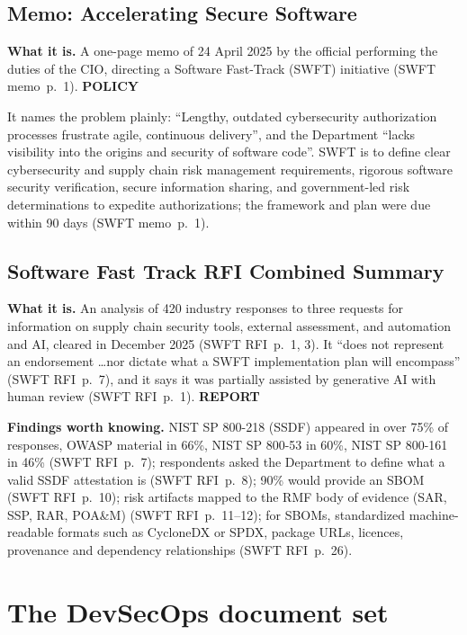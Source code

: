 \documentclass[11pt,letterpaper,twoside,openany]{memoir}
\newcommand{\pg}[2]{{\small(#1~p.~#2)}}          %
\newcommand{\st}[1]{{\sffamily\scriptsize\bfseries #1}}   %
\begin{document}
\section{Memo: Accelerating Secure Software}
\textbf{What it is.} A one-page memo of 24 April 2025 by the official performing the duties of the CIO, directing a
Software Fast-Track (SWFT) initiative \pg{SWFT memo}{1}. \st{POLICY}

It names the problem plainly: ``Lengthy, outdated cybersecurity authorization processes frustrate agile, continuous
delivery'', and the Department ``lacks visibility into the origins and security of software code''. SWFT is to define
clear cybersecurity and supply chain risk management requirements, rigorous software security verification, secure
information sharing, and government-led risk determinations to expedite authorizations; the framework and plan were
due within 90 days \pg{SWFT memo}{1}.

\section{Software Fast Track RFI Combined Summary}
\textbf{What it is.} An analysis of 420 industry responses to three requests for information on supply chain security
tools, external assessment, and automation and AI, cleared in December 2025 \pg{SWFT RFI}{1, 3}. It ``does not represent
an endorsement \dots nor dictate what a SWFT implementation plan will encompass'' \pg{SWFT RFI}{7}, and it says it was
partially assisted by generative AI with human review \pg{SWFT RFI}{1}. \st{REPORT}

\textbf{Findings worth knowing.} NIST SP 800-218 (SSDF) appeared in over 75\% of responses, OWASP material in 66\%,
NIST SP 800-53 in 60\%, NIST SP 800-161 in 46\% \pg{SWFT RFI}{7}; respondents asked the Department to define what a
valid SSDF attestation is \pg{SWFT RFI}{8}; 90\% would provide an SBOM \pg{SWFT RFI}{10}; risk artifacts mapped to the
RMF body of evidence (SAR, SSP, RAR, POA\&M) \pg{SWFT RFI}{11--12}; for SBOMs, standardized machine-readable formats
such as CycloneDX or SPDX, package URLs, licences, provenance and dependency relationships \pg{SWFT RFI}{26}.

\chapter{The DevSecOps document set}\label{ch:dso}
\end{document}
